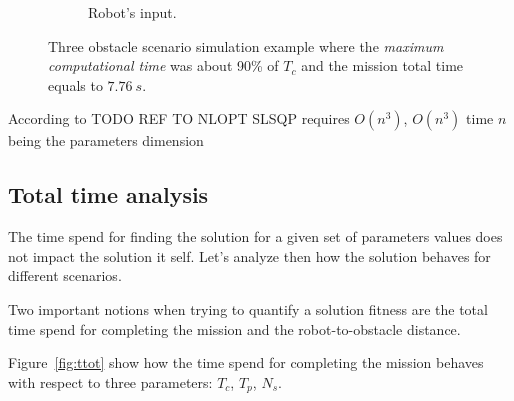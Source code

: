 \begin{figure}[!h]
\begin{subfigure}[b]{0.48\textwidth}
                \caption{Robot's input.}\label{fig:rinput}
        \end{subfigure}
        \caption{Three obstacle scenario simulation example where the \textit{maximum computational time} was about 90\% of $T_c$ and the mission total time equals to $7.76\ s$.}\label{fig:uni3}
\end{figure}


According to TODO REF TO NLOPT SLSQP requires $O(n^3)$, $O(n^3)$ time $n$ being the parameters dimension

\clearpage
\subsection{Total time analysis} \hspace{0pt} 

The time spend for finding the solution for a given set of
parameters values does not impact the solution it self.
Let's analyze then how the solution behaves for different scenarios.

Two important notions when trying to quantify a solution fitness are the total time spend for completing the mission and the robot-to-obstacle distance.

Figure~\ref{fig:ttot} show how the time spend for completing the mission behaves with respect to three parameters: $T_c$, $T_p$, $N_s$.

